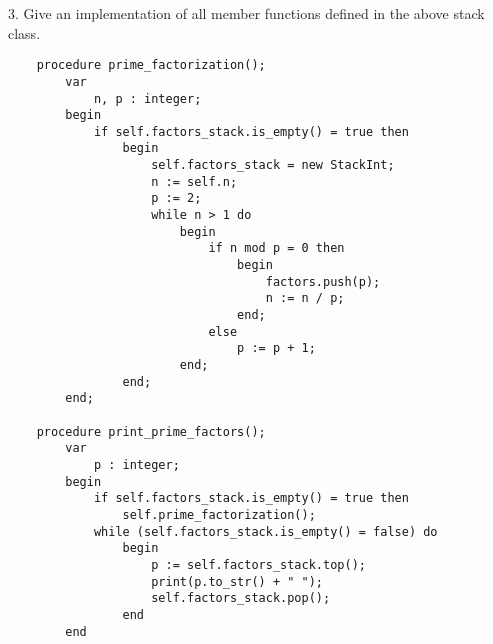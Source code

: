 \documentclass[12pt]{article}
\newenvironment{problem}[2][Problem]{\begin{trivlist}
\item[\hskip \labelsep {\bfseries #1}\hskip \labelsep {\bfseries #2.}]}{\end{trivlist}}
\begin{document}
\begin{problem}{2 (Stacks)}
    3. Give an implementation of all member functions defined in the above stack class.
\begin{verbatim}
    procedure prime_factorization();
        var
            n, p : integer;
        begin
            if self.factors_stack.is_empty() = true then
                begin
                    self.factors_stack = new StackInt;
                    n := self.n;
                    p := 2;
                    while n > 1 do
                        begin
                            if n mod p = 0 then
                                begin
                                    factors.push(p);
                                    n := n / p;
                                end;
                            else
                                p := p + 1;
                        end;
                end;
        end;
    
    procedure print_prime_factors();
        var
            p : integer;
        begin
            if self.factors_stack.is_empty() = true then 
                self.prime_factorization();
            while (self.factors_stack.is_empty() = false) do
                begin
                    p := self.factors_stack.top();
                    print(p.to_str() + " ");
                    self.factors_stack.pop();
                end
        end
\end{verbatim}
\end{problem}

\pagebreak
\end{document}
